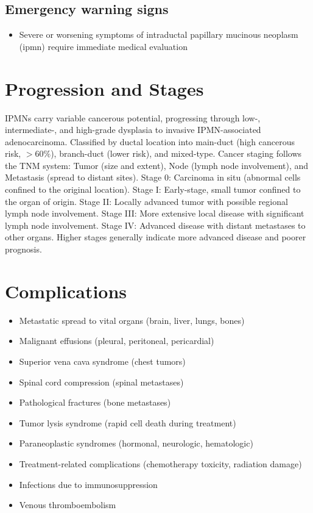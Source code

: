 \subsection{Emergency warning signs}
\begin{itemize}[noitemsep]
  \item Severe or worsening symptoms of intraductal papillary mucinous neoplasm (ipmn) require immediate medical evaluation
\end{itemize}
\section{Progression and Stages}
IPMNs carry variable cancerous potential, progressing through low-, intermediate-, and high-grade dysplasia to invasive IPMN-associated adenocarcinoma. Classified by ductal location into main-duct (high cancerous risk, $>60\%$), branch-duct (lower risk), and mixed-type. Cancer staging follows the TNM system: Tumor (size and extent), Node (lymph node involvement), and Metastasis (spread to distant sites). Stage 0: Carcinoma in situ (abnormal cells confined to the original location). Stage I: Early-stage, small tumor confined to the organ of origin. Stage II: Locally advanced tumor with possible regional lymph node involvement. Stage III: More extensive local disease with significant lymph node involvement. Stage IV: Advanced disease with distant metastases to other organs. Higher stages generally indicate more advanced disease and poorer prognosis.
\section{Complications}
\begin{itemize}[noitemsep]
  \item Metastatic spread to vital organs (brain, liver, lungs, bones)
  \item Malignant effusions (pleural, peritoneal, pericardial)
  \item Superior vena cava syndrome (chest tumors)
  \item Spinal cord compression (spinal metastases)
  \item Pathological fractures (bone metastases)
  \item Tumor lysis syndrome (rapid cell death during treatment)
  \item Paraneoplastic syndromes (hormonal, neurologic, hematologic)
  \item Treatment-related complications (chemotherapy toxicity, radiation damage)
  \item Infections due to immunosuppression
  \item Venous thromboembolism
\end{itemize}
